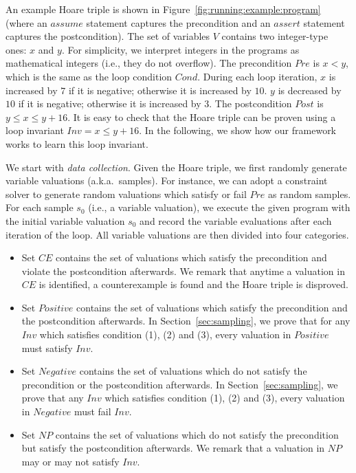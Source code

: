 \begin{example}
An example Hoare triple is shown in Figure~\ref{fig:running:example:program} (where an $assume$ statement captures the precondition and an $assert$ statement captures the postcondition). The set of variables $V$ contains two integer-type ones: $x$ and $y$. For simplicity, we interpret integers in the programs as mathematical integers (i.e., they do not overflow). The precondition $Pre$ is $x < y$, which is the same as the loop condition $Cond$.
During each loop iteration, $x$ is increased by $7$ if it is negative; otherwise it is increased by $10$. $y$ is decreased by $10$ if it is negative; otherwise it is increased by $3$. The postcondition $Post$ is $y \le x \le y + 16$. It is easy to check that the Hoare triple can be proven using a loop invariant $Inv = x \le y + 16$. In the following, we show how our framework works to learn this loop invariant.
\end{example}
We start with \emph{data collection}. Given the Hoare triple, we first randomly generate variable valuations (a.k.a.~samples). For instance, we can adopt a constraint solver to generate random valuations which satisfy or fail $Pre$ as random samples. For each sample $s_0$ (i.e., a variable valuation), we execute the given program with the initial variable valuation $s_0$ and record the variable evaluations after each iteration of the loop. %
All variable valuations are then divided into four categories.
\begin{itemize}
    \item Set $\mathit{CE}$ contains the set of valuations which satisfy the precondition and violate the postcondition afterwards. We remark that anytime a valuation in $\mathit{CE}$ is identified, a counterexample is found and the Hoare triple is disproved. 
    \item Set $\mathit{Positive}$ contains the set of valuations which satisfy the precondition and the postcondition afterwards. In Section~\ref{sec:sampling}, we prove that for any $\mathit{Inv}$ which satisfies condition (1), (2) and (3), every valuation in $\mathit{Positive}$ must satisfy $\mathit{Inv}$.
    \item Set $\mathit{Negative}$ contains the set of valuations which do not satisfy the precondition or the postcondition afterwards. In Section~\ref{sec:sampling}, we prove that any $\mathit{Inv}$ which satisfies condition (1), (2) and (3), every valuation in $\mathit{Negative}$ must fail $\mathit{Inv}$.
    \item Set $\mathit{NP}$ contains the set of valuations which do not satisfy the precondition but satisfy the postcondition afterwards. We remark that a valuation in $\mathit{NP}$ may or may not satisfy $\mathit{Inv}$.
\end{itemize}
